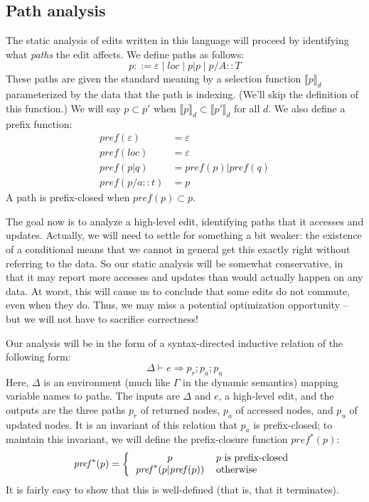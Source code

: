\documentclass{article}
\newcommand{\bracket}[1]{\llbracket#1\rrbracket}
\newcommand{\loc}{\ensuremath{\mathit{loc}}\xspace}
\newcommand{\prefix}{\ensuremath{\mathit{pref}}}
\begin{document}
\subsection{Path analysis}
The static analysis of edits written in this language will proceed by
identifying what \emph{paths} the edit affects. We define paths as follows:
\[p ::= \varepsilon \mid \loc \mid p|p \mid p/A::T\]
These paths are given the standard meaning by a selection function $\bracket
p_d$ parameterized by the data that the path is indexing. (We'll skip the
definition of this function.) We will say $p \subset p'$ when $\bracket p_d
\subset \bracket{p'}_d$ for all $d$. We also define a prefix function:
\begin{align*}
    \prefix(\varepsilon) &= \varepsilon \\
    \prefix(\loc) &= \varepsilon \\
    \prefix(p|q) &= \prefix(p)|\prefix(q) \\
    \prefix(p/a::t) &= p
\end{align*}
A path is prefix-closed when $\prefix(p) \subset p$.

The goal now is to analyze a high-level edit, identifying paths that it
accesses and updates. Actually, we will need to settle for something a bit
weaker: the existence of a conditional means that we cannot in general get
this exactly right without referring to the data. So our static analysis
will be somewhat conservative, in that it may report more accesses and
updates than would actually happen on any data. At worst, this will cause
us to conclude that some edits do not commute, even when they do. Thus, we
may miss a potential optimization opportunity -- but we will not have to
sacrifice correctness!

Our analysis will be in the form of a syntax-directed inductive relation of
the following form:
\[\Delta \vdash e \Rightarrow p_r;p_a;p_u\]
Here, $\Delta$ is an environment (much like $\Gamma$ in the dynamic
semantics) mapping variable names to paths. The inputs are $\Delta$ and $e$,
a high-level edit, and the outputs are the three paths $p_r$ of returned
nodes, $p_a$ of accessed nodes, and $p_u$ of updated nodes. It is an
invariant of this relation that $p_a$ is prefix-closed; to maintain this
invariant, we will define the prefix-closure function $\prefix^*(p)$:
\[\prefix^*(p) = \left\{\begin{tabular}{cl}
    $p$ & $p$ is prefix-closed \\
    $\prefix^*(p|\prefix(p))$ & otherwise
\end{tabular}\right.\]
It is fairly easy to show that this is well-defined (that is, that it
terminates).
\end{document}
